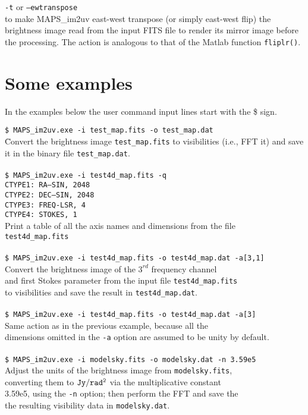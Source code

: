 \documentclass[letterpaper, twoside, 12pt]{article}
\begin{document}
{\tt -t} or {\tt --ewtranspose} \\

to make MAPS\_im2uv east-west transpose (or simply east-west flip) the 
brightness image read from the input FITS file to render its mirror image 
before the processing. The action is analogous to that of the Matlab function 
{\tt fliplr()}. 


\section*{Some examples}
In the examples below the user command input lines start with the \$ sign.

\begin{tabbing}
{\tt \$ MAPS\_im2uv.exe -i test\_map.fits -o test\_map.dat} \\
   \hspace{10mm} \=  Convert the brightness image {\tt test\_map.fits} to 
visibilities (i.e., FFT it) and save \\ 
   \> it in the binary file {\tt test\_map.dat}.\\
\\
{\tt \$ MAPS\_im2uv.exe -i test4d\_map.fits -q} \\
{\tt CTYPE1: RA---SIN,       2048} \\
{\tt CTYPE2: DEC--SIN,       2048} \\
{\tt CTYPE3: FREQ-LSR,       4} \\
{\tt CTYPE4: STOKES,         1} \\

   \> Print a table of all the axis names and dimensions from the file \\ 
{\tt test4d\_map.fits} \\
\\
{\tt \$ MAPS\_im2uv.exe -i test4d\_map.fits -o test4d\_map.dat -a[3,1]}\\ 
   \> Convert the brightness image of the $3^{rd}$ frequency channel \\
   \> and first Stokes parameter from the input file {\tt test4d\_map.fits} \\
   \> to visibilities and save the result in {\tt test4d\_map.dat}.\\
\\
{\tt \$ MAPS\_im2uv.exe -i test4d\_map.fits -o test4d\_map.dat -a[3]}\\ 
   \> Same action as in the previous example, because all the \\ \> dimensions omitted in the {\tt -a} option are assumed to be unity by default.\\
\\
{\tt \$ MAPS\_im2uv.exe -i modelsky.fits -o modelsky.dat -n 3.59e5}\\ 
\> Adjust the units of the brightness image from {\tt modelsky.fits}, \\
\> converting them to ${\tt Jy/rad^2}$ via the multiplicative constant \\ 
\> 3.59e5, using the {\tt -n} option; then perform the FFT and save the \\
\> the resulting visibility data in {\tt modelsky.dat}.
\\
\end{tabbing}
\end{document}
